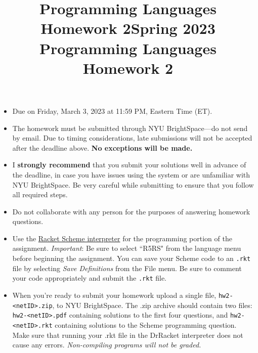\documentclass{exam}
\title{Programming Languages Homework 2}
\date{}
\begin{document}
 

\title{Spring 2023\\Programming Languages\\Homework 2}

\maketitle
\begin{itemize}
\item Due on Friday, March 3, 2023 at 11:59 PM, Eastern Time (ET).   

\item The homework must be submitted through NYU BrightSpace---do not send by email.  Due to timing considerations,
   late submissions will not be accepted after the deadline above.  {\bf No exceptions will be made.}  

\item I {\bf strongly recommend} that you submit your solutions well in advance of the deadline, in case you have
  issues using the system or are unfamiliar with NYU BrightSpace.  Be very careful
   while submitting to ensure that you follow all required steps.
  
\item Do not collaborate with any person for the purposes of answering homework questions.

\item Use the \href{http://racket-lang.org/}{Racket Scheme interpreter} for the programming portion of the assignment.
\emph{Important}: Be sure to select ``R5RS" from the language menu before beginning the assignment.  You can save your Scheme code to an {\tt .rkt} file by selecting \emph{Save Definitions} from the File menu.  Be sure to comment your code appropriately and submit the {\tt .rkt} file.

\item When you're ready to submit your homework upload a single file, \verb#hw2-<netID>.zip#, to NYU BrightSpace. The .zip archive should contain two files: \verb#hw2-<netID>.pdf# containing solutions to the first four questions, and \verb#hw2-<netID>.rkt# containing solutions to the Scheme programming question. Make sure that running your .rkt file in the DrRacket interpreter does not cause any errors. \emph{Non-compiling programs will not be graded.}

\end{itemize}


\newpage

\bracketedpoints
\nopointsinmargin
\end{document}
